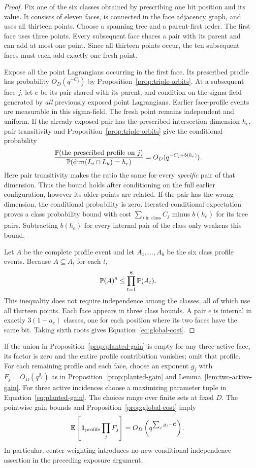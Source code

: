 \begin{proof}
Fix one of the six classes obtained by prescribing one bit position and
its value.  It consists of eleven faces, is connected in the face
adjacency graph, and uses all thirteen points.  Choose a spanning tree
and a parent-first order.  The first face uses three points.  Every
subsequent face shares a pair with its parent and can add at most one
point.  Since all thirteen points occur, the ten subsequent faces must
each add exactly one fresh point.

Expose all the point Lagrangians occurring in the first face.  Its
prescribed profile has probability $O_D(q^{-C_j})$ by
Proposition~\ref{prop:triple-orbits}.  At a subsequent face $j$, let $e$
be its pair shared with its parent, and condition on the sigma-field
generated by \emph{all} previously exposed point Lagrangians.  Earlier
face-profile events are measurable in this sigma-field.  The fresh
point remains independent and uniform.  If the already exposed pair
has the prescribed intersection dimension $h_e$, pair transitivity and
Proposition~\ref{prop:triple-orbits} give the conditional probability
\[
 \frac{\P(\text{the prescribed profile on }j)}
      {\P(\dim(L_i\cap L_k)=h_e)}
 =O_D(q^{-C_j+b(h_e)}).
\]
Here pair transitivity makes the ratio the same for every \emph{specific}
pair of that dimension.  Thus the bound holds after conditioning on
the full earlier configuration, however its older points are related.
If the pair has the wrong dimension, the conditional probability is
zero.  Iterated conditional expectation proves a class probability
bound with cost $\sum_{j\text{ in class}}C_j$ minus $b(h_e)$ for its tree
pairs.  Subtracting $b(h_e)$ for every internal pair of the class only
weakens this bound.

Let $A$ be the complete profile event and let $A_1,\ldots,A_6$ be the six
class profile events.  Because $A\subseteq A_t$ for each $t$,
\[
 \P(A)^6\le\prod_{t=1}^6\P(A_t).
\]
This inequality does not require independence among the classes, all
of which use all thirteen points.  Each face appears in three class
bounds.  A pair $e$ is internal in exactly $3(1-a_e)$ classes, one for
each position where its two faces have the same bit.  Taking sixth
roots gives Equation~\eqref{eq:global-cost}.
\end{proof}

If the union in Proposition~\ref{prop:planted-gain} is empty for any
three-active face, its factor is zero and the entire profile contribution
vanishes; omit that profile. For each remaining profile and each face,
choose an exponent $g_j$ with $F_j=O_D(q^{g_j})$ as in
Proposition~\ref{prop:planted-gain} and Lemma~\ref{lem:two-active-gain}.
For three active incidences choose a maximizing parameter tuple in
Equation~\eqref{eq:planted-gain}. The choices range over finite sets
at fixed $D$. The pointwise gain bounds
and Proposition~\ref{prop:global-cost} imply
\begin{equation}\label{eq:tail-profile-bound}
 \E\left[\1_{\text{profile}}\prod_jF_j\right]
 =O_D\left(q^{\sum_jg_j-\mathcal C}\right).
\end{equation}
In particular, center weighting introduces no new conditional
independence assertion in the preceding exposure argument.

